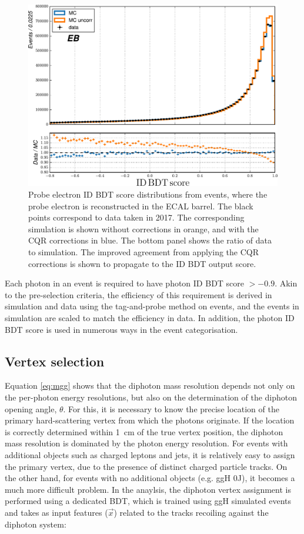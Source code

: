 \begin{figure}[htb!]
  \centering
  \includegraphics[width=.6\textwidth]{Figures/hgg_overview/dataMC_probePhoIdMVA_0_corr.pdf}
  \caption[Corrections from the chained quantile regression method in the ID BDT output score]
  {
    Probe electron ID BDT score distributions from \Zee events, where the probe electron is reconstructed in the ECAL barrel. The black points correspond to data taken in 2017. The corresponding simulation is shown without corrections in orange, and with the CQR corrections in blue. The bottom panel shows the ratio of data to simulation. The improved agreement from applying the CQR corrections is shown to propagate to the ID BDT output score.
  }
  \label{fig:photon_id_2}
\end{figure}

Each photon in an event is required to have photon ID BDT score $>-0.9$. Akin to the pre-selection criteria, the efficiency of this requirement is derived in simulation and data using the tag-and-probe method on \Zee events, and the events in simulation are scaled to match the efficiency in data. In addition, the photon ID BDT score is used in numerous ways in the event categorisation.

\subsection{Vertex selection}\label{sec:vertex_selection}
Equation \ref{eq:mgg} shows that the diphoton mass resolution depends not only on the per-photon energy resolutions, but also on the determination of the diphoton opening angle, $\theta$. For this, it is necessary to know the precise location of the primary hard-scattering vertex from which the photons originate. If the location is correctly determined within 1~cm of the true vertex position, the diphoton mass resolution is dominated by the photon energy resolution. For events with additional objects such as charged leptons and jets, it is relatively easy to assign the primary vertex, due to the presence of distinct charged particle tracks. On the other hand, for \Hgg events with no additional objects (e.g. ggH 0J), it becomes a much more difficult problem. In the \Hgg anaylsis, the diphoton vertex assignment is performed using a dedicated BDT, which is trained using ggH \Hgg simulated events and takes as input features ($\vec{x}$) related to the tracks recoiling against the diphoton system:

